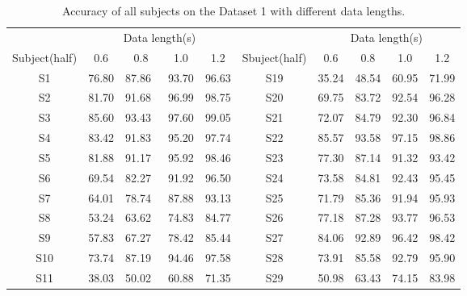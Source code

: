 \documentclass[10pt]{iopart}
\begin{document}
\begin{table*}[htbp]
\begin{center}
\caption{Accuracy of all subjects on the Dataset 1 with different data lengths.}
\begin{tabular}{c|cccc|c|cccc}
\hline
              & \multicolumn{4}{c|}{Data length(s)}   &                  & \multicolumn{4}{c}{Data length(s)}                                        \\ \cline{2-5} \cline{7-10} 
Subject(half) & 0.6     & 0.8     & 1.0     & 1.2     & Sbuject(half) & 0.6              & 0.8              & 1.0              & 1.2              \\ \hline
S1            & 76.80 & 87.86\ & 93.70 & 96.63 & S19              & 35.24          & 48.54          & 60.95          & 71.99          \\
S2            & 81.70 & 91.68\ & 96.99 & 98.75 & S20              & 69.75          & 83.72          & 92.54          & 96.28          \\
S3            & 85.60 & 93.43\ & 97.60 & 99.05 & S21              & 72.07          & 84.79          & 92.30          & 96.84          \\
S4            & 83.42 & 91.83\ & 95.20 & 97.74 & S22              & 85.57          & 93.58          & 97.15          & 98.86          \\
S5            & 81.88 & 91.17\ & 95.92 & 98.46 & S23              & 77.30        & 87.14          & 91.32        & 93.42          \\
S6            & 69.54 & 82.27\ & 91.92 & 96.50 & S24              & 73.58          & 84.81          & 92.43          & 95.45          \\
S7            & 64.01 & 78.74\ & 87.88 & 93.13 & S25              & 71.79          & 85.36          & 91.94          & 95.93          \\
S8            & 53.24 & 63.62\ & 74.83 & 84.77 & S26              & 77.18          & 87.28          & 93.77          & 96.53          \\
S9            & 57.83 & 67.27\ & 78.42 & 85.44 & S27              & 84.06          & 92.89          & 96.42          & 98.42          \\
S10           & 73.74 & 87.19\ & 94.46 & 97.58 & S28              & 73.91          & 85.58          & 92.79          & 95.90          \\
S11           & 38.03 & 50.02\ & 60.88 & 71.35 & S29              & 50.98          & 63.43          & 74.15          & 83.98          \\

\end{tabular}
\end{center}
\end{table*}
\end{document}
